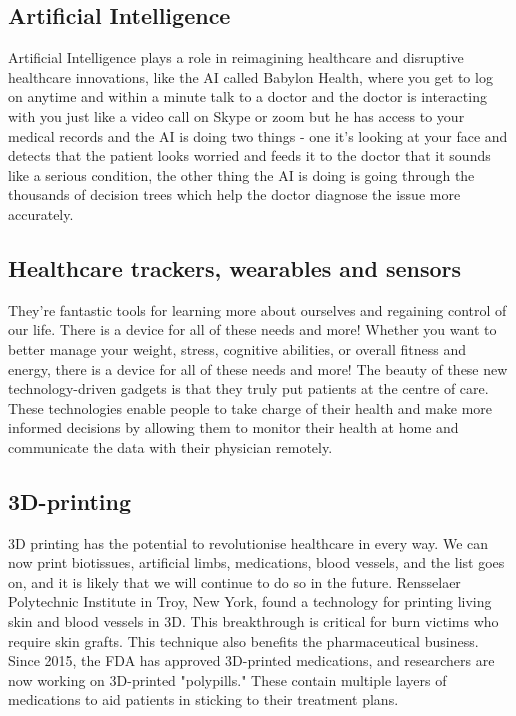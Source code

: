 \documentclass[12pt]{article}
\begin{document}
\subsection{Artificial Intelligence}
Artificial Intelligence plays a role in reimagining healthcare and disruptive healthcare innovations, like the AI called Babylon Health, where you get to log on anytime and within a minute talk to a doctor and the doctor is interacting with you just like a video call on Skype or zoom but he has access to your medical records and the AI is doing two things - one it's looking at your face and detects that the patient looks worried and feeds it to the doctor that it sounds like a serious condition,  the other thing the AI is doing is going through the thousands of decision trees which help the doctor diagnose the issue more accurately. 

\subsection{Healthcare trackers, wearables and sensors}
They're fantastic tools for learning more about ourselves and regaining control of our life. There is a device for all of these needs and more! Whether you want to better manage your weight, stress, cognitive abilities, or overall fitness and energy, there is a device for all of these needs and more! The beauty of these new technology-driven gadgets is that they truly put patients at the centre of care. These technologies enable people to take charge of their health and make more informed decisions by allowing them to monitor their health at home and communicate the data with their physician remotely.
\subsection{3D-printing}
3D printing has the potential to revolutionise healthcare in every way. We can now print biotissues, artificial limbs, medications, blood vessels, and the list goes on, and it is likely that we will continue to do so in the future. Rensselaer Polytechnic Institute in Troy, New York, found a technology for printing living skin and blood vessels in 3D. This breakthrough is critical for burn victims who require skin grafts. This technique also benefits the pharmaceutical business. Since 2015, the FDA has approved 3D-printed medications, and researchers are now working on 3D-printed "polypills." These contain multiple layers of medications to aid patients in sticking to their treatment plans.
\end{document}
